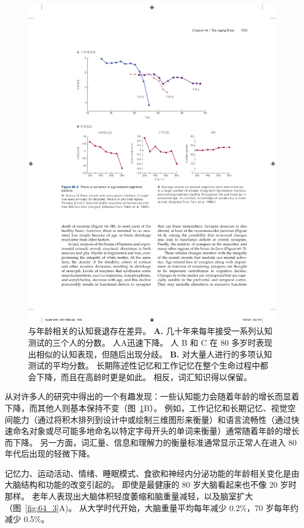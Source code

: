 \begin{figure}[htbp]
	\centering
	\includegraphics[width=0.95\linewidth]{chap64/fig_64_2}
	\caption{与年龄相关的认知衰退存在差异。
		\textbf{A.} 几十年来每年接受一系列认知测试的三个人的分数。
		人A迅速下降。
		人 B 和 C 在 80 多岁时表现出相似的认知表现，但随后出现分歧\cite{rubin1998prospective}。
		\textbf{B.} 对大量人进行的多项认知测试的平均分数。
		长期陈述性记忆和工作记忆在整个生命过程中都会下降，而且在高龄时更是如此。
		相反，词汇知识得以保留\cite{park1996mediators}。}
	\label{fig:64_2}
\end{figure}


从对许多人的研究中得出的一个有趣发现：一些认知能力会随着年龄的增长而显着下降，而其他人则基本保持不变（图~\ref{fig:64_2}B）。
例如，工作记忆和长期记忆、视觉空间能力（通过将积木排列到设计中或绘制三维图形来衡量）和语言流畅性（通过快速命名对象或尽可能多地命名以特定字母开头的单词来衡量）通常随着年龄的增长而下降。
另一方面，词汇量、信息和理解力的衡量标准通常显示正常人在进入 80 年代后出现的轻微下降。


记忆力、运动活动、情绪、睡眠模式、食欲和神经内分泌功能的年龄相关变化是由大脑结构和功能的改变引起的。
即使是最健康的 80 岁大脑看起来也不像 20 岁时那样。
老年人表现出大脑体积轻度萎缩和脑重量减轻，以及脑室扩大（图~\ref{fig:64_3}A)。
从大学时代开始，大脑重量平均每年减少 0.2\%，70 岁每年约减少 0.5\%。


